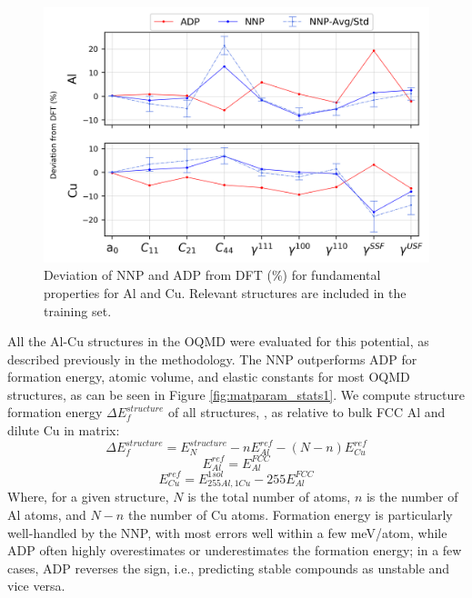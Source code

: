 \documentclass{article}
\begin{document}
\begin{figure}[H]%
\centering%
\includegraphics[width=1\textwidth,center]{./figures/matparam_purestats.png}%
\caption{Deviation of NNP and ADP from DFT (\%) for fundamental properties for Al and Cu. 
Relevant structures are included in the training set. }%
\label{fig:matparam_purestats}
\end{figure}
All the Al-Cu structures in the OQMD were evaluated for this potential, as described previously in the methodology.
The NNP outperforms ADP for formation energy, atomic volume, and elastic constants for most OQMD structures, as can be seen in Figure \ref{fig:matparam_stats1}.
We compute structure formation energy $\Delta E^{structure}_f$ of all structures,
, as relative to bulk FCC Al and dilute Cu in matrix:
\begin{equation} \label{eqn:formE_structure}
\Delta E^{structure}_f = E^{structure}_N - nE^{ref}_{Al}-(N-n)E^{ref}_{Cu}
\end{equation}
\begin{equation} \label{eqn:formRef_Al}
E^{ref}_{Al} = E^{FCC}_{Al}
\end{equation}
\begin{equation} \label{eqn:formRef_Cu}
E^{ref}_{Cu} = E^{1sol}_{255Al,1Cu} - 255E^{FCC}_{Al}
\end{equation}
Where, for a given structure, $N$ is the total number of atoms, $n$ is the number of Al atoms, and $N-n$ the number of Cu atoms. Formation energy is particularly well-handled by the NNP, with most errors well within a few meV/atom, while ADP often highly overestimates or underestimates the formation energy;
in a few cases, ADP reverses the sign, i.e., predicting stable compounds as unstable and vice versa.
\end{document}
